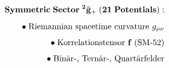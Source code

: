 \documentclass[preview]{standalone}
\begin{document}
\begin{align*}
\special{dvisvgm:raw <g id='unique000'>}\mathbf{Symmetric\;Sector\;{}^2\bar{\mathbf{g}}_+\;(21\;Potentials):}\\[5pt]\bullet\;\text{Riemannian spacetime curvature }g_{\mu\nu}\\[4pt]\bullet\;\text{Korrelationstensor }\mathbf{f}\;(\text{SM-52})\\[4pt]\bullet\;\text{Binär-, Ternär-, Quartärfelder}\special{dvisvgm:raw </g>}
\end{align*}
\end{document}

